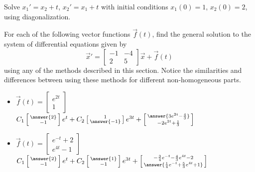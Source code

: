 \documentclass{ximera}
\begin{document}
\begin{exercise}%
    Solve $x_1' = x_2 + t$, $x_2' = x_1 +t$ with initial conditions $x_1(0) = 1$, $x_2(0) = 2$, using diagonalization. %
\end{exercise}

\begin{exercise}
    For each of the following vector functions $\vec{f}(t)$, find the general solution to the system of differential equations given by
    \[ {\vec{x}}' = \begin{bmatrix} -1 & -4 \\ 2 & 5 \end{bmatrix} \vec{x} + \vec{f}(t)\] using any of the methods described in this section. Notice the similarities and differences between using these methods for different non-homogeneous parts.
    \begin{itemize}
        \item $\vec{f}(t) = \begin{bmatrix} e^{2t} \\ 1 \end{bmatrix}$\\
            $C_1\left[\begin{smallmatrix} \answer{2} \\ -1 \end{smallmatrix}\right]e^{t} + C_2\left[\begin{smallmatrix} 1 \\ \answer{-1} \end{smallmatrix}\right]e^{3t} + \left[\begin{smallmatrix} \answer{3e^{2t} - \frac{4}{3}} \\ -2e^{2t} + \frac{1}{3} \end{smallmatrix}\right]$
        \item $\vec{f}(t) = \begin{bmatrix} e^{-t} + 2 \\ e^{4t} - 1 \end{bmatrix}$\\
            $C_1\left[\begin{smallmatrix} \answer{2} \\ -1 \end{smallmatrix}\right]e^{t} + C_2\left[\begin{smallmatrix} \answer{1} \\ -1 \end{smallmatrix}\right]e^{3t} + \left[\begin{smallmatrix} -\frac{3}{4}e^{-t} - \frac{4}{3}e^{4t} - 2 \\ \answer{\frac{1}{4}e^{-t} + \frac{5}{3}e^{4t} + 1} \end{smallmatrix}\right]$

\end{itemize}
\end{exercise}
\end{document}
